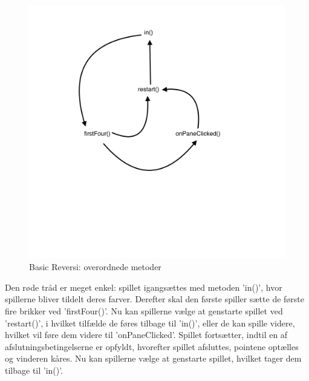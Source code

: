 \begin{figure}[H]
    \centering
    \caption{Basic Reversi: overordnede metoder}\label{BRF}
    \includegraphics[width=1\textwidth]{Graphics/Basis.png}
\end{figure}
Den røde tråd er meget enkel: spillet igangsættes med metoden 'in()', hvor spillerne bliver tildelt deres farver. Derefter skal den første spiller sætte de første fire brikker ved 'firstFour()'. Nu kan spillerne vælge at genstarte spillet ved 'restart()', i hvilket tilfælde de føres tilbage til 'in()', eller de kan spille videre, hvilket vil føre dem videre til 'onPaneClicked'. Spillet fortsætter, indtil en af afslutningsbetingelserne er opfyldt, hvorefter spillet afsluttes, pointene optælles og vinderen kåres. Nu kan spillerne vælge at genstarte spillet, hvilket tager dem tilbage til 'in()'.
